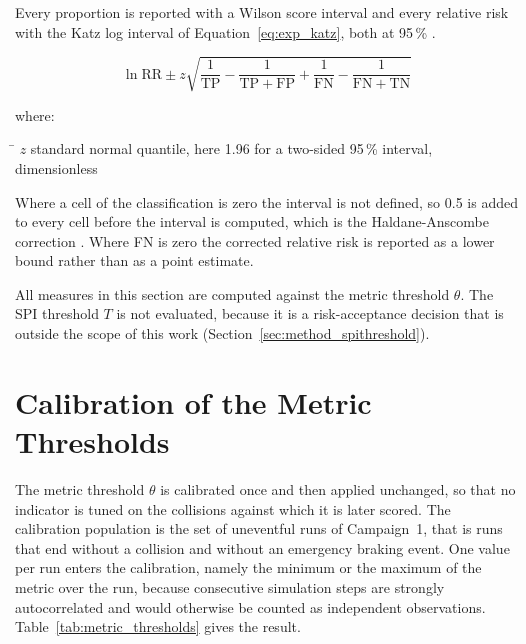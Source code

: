Every proportion is reported with a Wilson score interval and every relative risk
with the Katz log interval of Equation~\eqref{eq:exp_katz}, both at 95\,\%
\cite{wilson1927probable} \cite{katz1978risk}.

\begin{equation}
    \ln \mathrm{RR} \pm z \sqrt{\frac{1}{\mathrm{TP}}
        - \frac{1}{\mathrm{TP} + \mathrm{FP}}
        + \frac{1}{\mathrm{FN}}
        - \frac{1}{\mathrm{FN} + \mathrm{TN}}}
    \label{eq:exp_katz}
\end{equation}

where:\nopagebreak
\begin{tabbing}
    \hspace{2.2cm} \= \kill
    $z$ \> standard normal quantile, here 1.96 for a two-sided 95\,\% interval, dimensionless
\end{tabbing}

Where a cell of the classification is zero the interval is not defined, so 0.5 is
added to every cell before the interval is computed, which is the
Haldane-Anscombe correction \cite{haldane1956} \cite{anscombe1956}. Where FN is zero the corrected relative risk is
reported as a lower bound rather than as a point estimate.

All measures in this section are computed against the metric threshold
$\theta$. The SPI threshold $T$ is not evaluated, because it is a risk-acceptance
decision that is outside the scope of this work
(Section~\ref{sec:method_spithreshold}).

\section{Calibration of the Metric Thresholds}
\label{sec:exp_calibration}

The metric threshold $\theta$ is calibrated once and then applied unchanged, so
that no indicator is tuned on the collisions against which it is later scored.
The calibration population is the set of uneventful runs of Campaign~1, that is
runs that end without a collision and without an emergency braking event. One
value per run enters the calibration, namely the minimum or the maximum of the
metric over the run, because consecutive simulation steps are strongly
autocorrelated and would otherwise be counted as independent observations.
Table~\ref{tab:metric_thresholds} gives the result.

